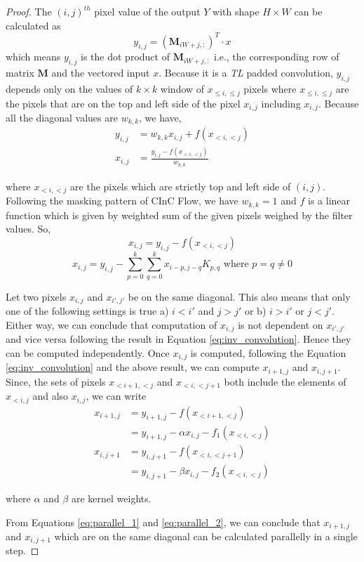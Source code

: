 \documentclass[a4paper,twoside]{article}
\theoremstyle{definition}
\begin{document}
\begin{proof}
The $(i, j)^{th}$ pixel value of the output $Y$ with shape $H \times W$ can be calculated as 
$$
y_{i, j} = (\textbf{M}_{iW+j, :})^T \cdot x
$$ 
which means $y_{i,j}$ is the dot product of $\textbf{M}_{iW+j, :}$ i.e., the corresponding row of matrix $\textbf{M}$ and the vectored input $x$.
Because it is a \emph{TL} padded convolution, $y_{i,j}$ depends only on the values of $k \times k$ window of $x_{\le i, \le j}$ pixels where $x_{\le i, \le j}$ are the pixels that are on the top and left side of the pixel $x_{i, j}$ including $x_{i, j}$. Because all the diagonal values are $w_{k, k}$, we have, 
\begin{align*}
y_{i, j} &= w_{k, k} x_{i, j} + f(x_{<i, <j})\\ 
x_{i, j} &= \frac{y_{i, j} - f(x_{<i, <j})}{w_{k, k}}   
\end{align*}

where $x_{<i, <j}$ are the pixels which are strictly top and left side of $(i, j)$. Following the masking pattern of CInC Flow, we have $w_{k, k} = 1$ and $f$ is a linear function which is given by weighted sum of the given pixels weighed by the filter values. So,
\begin{equation}
\label{eq:inv_convolution}
x_{i, j} = y_{i, j} - f(x_{<i, <j})
\end{equation}
\begin{equation}
\label{eq:inv_convolution_imp}
x_{i, j} = y_{i, j} - \sum_{p=0}^{k} \sum_{q=0}^{k} x_{i-p, j-q} K_{p, q}  \text{ where }  p = q \neq 0
\end{equation}

Let two pixels $x_{i, j}$ and $x_{i', j'}$ be  on the same diagonal. This also means that only one of the following settings is true a) $i < i'$ and $j > j'$ or b) $i > i'$ or $j < j'$. Either way, we can conclude that computation of $x_{i, j}$ is not dependent on $x_{i', j'}$ and vice versa following the result in Equation \ref{eq:inv_convolution}. Hence they can be computed independently.
Once $x_{i, j}$ is computed, following the Equation \ref{eq:inv_convolution} and the above result, we can compute $x_{i + 1, j}$ and $x_{i, j+1}$. Since, the sets of pixels $x_{<i+1, <j}$ and $x_{<i, <j+1}$ both include the elements of $x_{<i, j}$ and also $x_{i, j}$, we can write
\begin{align}
x_{i + 1, j} &= y_{i+1, j} - f(x_{<i+1, <j}) \nonumber\\
&=y_{i+1, j} - \alpha x_{i, j} - f_1(x_{<i, <j})\label{eq:parallel_1}\\
x_{i, j+1} &= y_{i, j+1} - f(x_{<i, <j+1}) \nonumber\\
&=y_{i, j+1} - \beta x_{i, j} - f_2(x_{<i, <j}) \label{eq:parallel_2}
\end{align}

where $\alpha$ and $\beta$ are kernel weights.

From Equations \ref{eq:parallel_1}  and \ref{eq:parallel_2}, we can conclude that $x_{i+1, j}$ and $x_{i, j+1}$ which are on the same diagonal can be calculated parallelly in a single step.
\end{proof}
\end{document}
